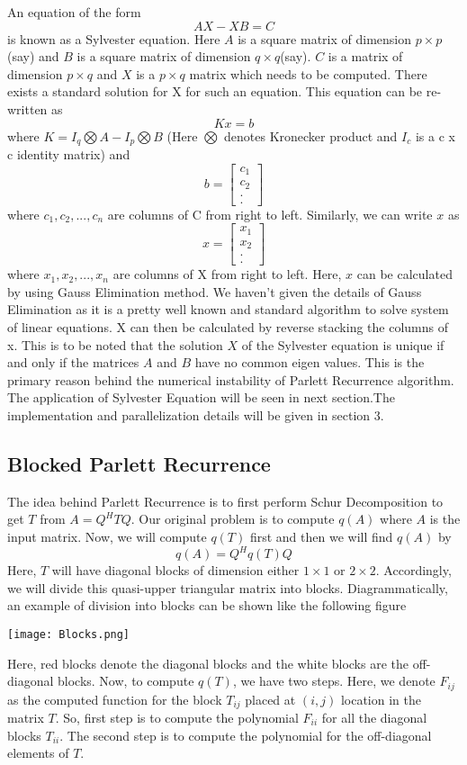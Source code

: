 \documentclass[12pt,a4paper]{article}
\begin{document}
An equation of the form $$AX - XB = C$$ is known as a Sylvester equation. Here $A$ is a square matrix of dimension $p \times p$(say) and $B$ is a square matrix of dimension $q \times q$(say). $C$ is a matrix of dimension $p \times q$ and $X$ is a $p \times q$ matrix which needs to be computed. There exists a standard solution for X for such an equation. This equation can be re-written as $$Kx=b$$ where $K=I_q\bigotimes A- I_p\bigotimes B$ (Here $\bigotimes$ denotes Kronecker product and $I_c$ is a c x c identity matrix) and $$b=\begin{bmatrix}c_1 \\ c_2 \\ . \\ . \end{bmatrix}$$ 
where $c_1,c_2,...,c_n$ are columns of C from right to left. Similarly, we can write $x$ as
$$x=\begin{bmatrix}x_1 \\ x_2 \\ . \\ . \end{bmatrix}$$
where $x_1, x_2, ..., x_n$ are columns of X from right to left. Here, $x$ can be calculated by using Gauss Elimination method. We haven't given the details of Gauss Elimination as it is a pretty well known and standard algorithm to solve system of linear equations. X can then be calculated by reverse stacking the columns of x. 
This is to be noted that the solution $X$ of the Sylvester equation is unique if and only if the matrices $A$ and $B$ have no common eigen values. This is the primary reason behind the numerical instability of Parlett Recurrence algorithm. The application of Sylvester Equation will be seen in next section.The implementation and parallelization details will be given in section 3.

\subsection{Blocked Parlett Recurrence}
The idea behind Parlett Recurrence is to first perform Schur Decomposition to get $T$ from $A = Q^{H}TQ$. Our original problem is to compute $q(A)$ where $A$  is the input matrix. Now, we will compute $q(T)$ first and then we will find $q(A)$ by
$$q(A) = Q^{H}q(T)Q$$
Here, $T$ will have diagonal blocks of dimension either $1 \times 1$ or $2 \times 2$. Accordingly, we will divide this quasi-upper triangular matrix into blocks. Diagrammatically, an example of division into blocks can be shown like the following figure
\begin{center}
\texttt{[image: Blocks.png]}
\end{center}
Here, red blocks denote the diagonal blocks and the white blocks are the off-diagonal blocks. Now, to compute $q(T)$, we have two steps. Here, we denote $F_{ij}$ as the computed function for the block $T_{ij}$ placed at $(i, j)$ location in the matrix $T$. So, first step is to compute the polynomial $F_{ii}$ for all the diagonal blocks $T_{ii}$. The second step is to compute the polynomial for the off-diagonal elements of $T$.
\end{document}
